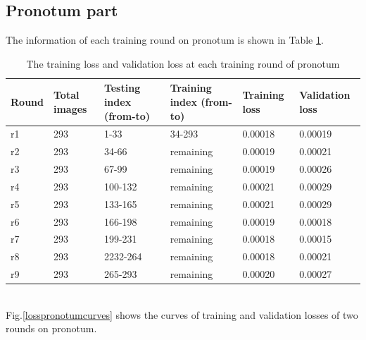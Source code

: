 \documentclass[12pt,a4paper]{article}
\begin{document}
\subsection{Pronotum part}
The information of each training round on pronotum is shown in Table \ref{pronoloss}.
\begin{table}[h!]
	\centering
	\begin{tabular}{l p{2cm} p{2.4cm} p{2.6cm} p{2.2cm} p{2.2cm}}
	Round & Total images & Testing index (from-to) & Training index (from-to) & Training loss & Validation loss \\ \hline
	r1 & 293 & 1-33 & 34-293 & 0.00018 & 0.00019 \\ \hline
	r2 & 293 & 34-66 & remaining & 0.00019 & 0.00021 \\ \hline
	r3 & 293 & 67-99 & remaining & 0.00019 & 0.00026 \\ \hline
	r4 & 293 & 100-132 & remaining & 0.00021 & 0.00029 \\ \hline
	r5 & 293 & 133-165 & remaining & 0.00021 & 0.00029 \\ \hline
	r6 & 293 & 166-198 & remaining & 0.00019 & 0.00018 \\ \hline
	r7 & 293 & 199-231 & remaining & 0.00018 & 0.00015 \\ \hline
	r8 & 293 & 2232-264 & remaining & 0.00018 & 0.00021 \\ \hline
	r9 & 293 & 265-293 & remaining & 0.00020 & 0.00027 \\ \hline	
	\end{tabular}
	\caption{The training loss and validation loss at each training round of pronotum}
	\label{pronoloss}
\end{table}~\\
Fig.\ref{losspronotumcurves} shows the curves of training and validation losses of two rounds on pronotum.
\end{document}
